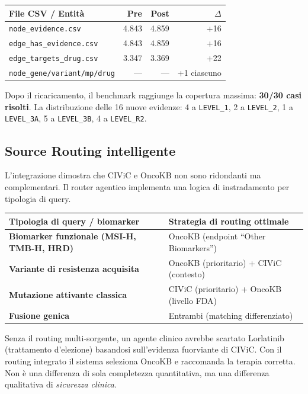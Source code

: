 \documentclass[11pt,a4paper]{article}
\newcommand{\code}[1]{\texttt{\small #1}}
\begin{document}
\begin{center}
\small
\begin{tabular}{@{}lrrr@{}}
\toprule
File CSV / Entit\`a & Pre & Post & $\Delta$ \\
\midrule
\code{node\_evidence.csv} & 4.843 & 4.859 & \color{passgreen}+16 \\
\code{edge\_has\_evidence.csv} & 4.843 & 4.859 & \color{passgreen}+16 \\
\code{edge\_targets\_drug.csv} & 3.347 & 3.369 & \color{passgreen}+22 \\
\code{node\_gene/variant/mp/drug} & --- & --- & \color{passgreen}+1 ciascuno \\
\bottomrule
\end{tabular}
\end{center}

\noindent Dopo il ricaricamento, il benchmark raggiunge la copertura massima: \textbf{30/30 casi risolti}. La distribuzione delle 16 nuove evidenze: 4 a \code{LEVEL\_1}, 2 a \code{LEVEL\_2}, 1 a \code{LEVEL\_3A}, 5 a \code{LEVEL\_3B}, 4 a \code{LEVEL\_R2}.

\subsection{Source Routing intelligente}
L'integrazione dimostra che CIViC e OncoKB non sono ridondanti ma complementari. Il router agentico implementa una logica di instradamento per tipologia di query.

\begin{center}
\small
\begin{tabularx}{\textwidth}{@{}>{\bfseries}p{5.4cm} X@{}}
\toprule
Tipologia di query / biomarker & Strategia di routing ottimale \\
\midrule
Biomarker funzionale (MSI-H, TMB-H, HRD) & OncoKB (endpoint ``Other Biomarkers'') \\
Variante di resistenza acquisita & OncoKB (prioritario) + CIViC (contesto) \\
Mutazione attivante classica & CIViC (prioritario) + OncoKB (livello FDA) \\
Fusione genica & Entrambi (matching differenziato) \\
\bottomrule
\end{tabularx}
\end{center}

\begin{tesibox}
Senza il routing multi-sorgente, un agente clinico avrebbe scartato Lorlatinib (trattamento d'elezione) basandosi sull'evidenza fuorviante di CIViC. Con il routing integrato il sistema seleziona OncoKB e raccomanda la terapia corretta. Non \`e una differenza di sola completezza quantitativa, ma una differenza qualitativa di \emph{sicurezza clinica}.
\end{tesibox}
\end{document}
